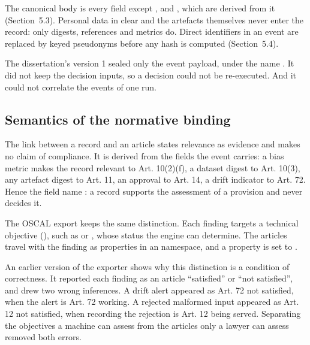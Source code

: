 The canonical body is every field except ,  and , which are derived from it (Section~5.3). Personal data in clear and the artefacts themselves never enter the record: only digests, references and metrics do. Direct identifiers in an event are replaced by keyed pseudonyms before any hash is computed (Section~5.4).

The dissertation's version 1 sealed only the event payload, under the name . It did not keep the decision inputs, so a decision could not be re-executed. And it could not correlate the events of one run.

\subsection{Semantics of the normative binding}

The link between a record and an article states relevance as evidence and makes no claim of compliance. It is derived from the fields the event carries: a bias metric makes the record relevant to Art. 10(2)(f), a dataset digest to Art. 10(3), any artefact digest to Art. 11, an approval to Art. 14, a drift indicator to Art. 72. Hence the field name : a record supports the assessment of a provision and never decides it.

The OSCAL export keeps the same distinction. Each finding targets a technical objective (), such as  or , whose status the engine can determine. The articles travel with the finding as  properties in an  namespace, and a  property is set to .

An earlier version of the exporter shows why this distinction is a condition of correctness. It reported each finding as an article ``satisfied'' or ``not satisfied'', and drew two wrong inferences. A drift alert appeared as Art. 72 not satisfied, when the alert is Art. 72 working. A rejected malformed input appeared as Art. 12 not satisfied, when recording the rejection is Art. 12 being served. Separating the objectives a machine can assess from the articles only a lawyer can assess removed both errors.
